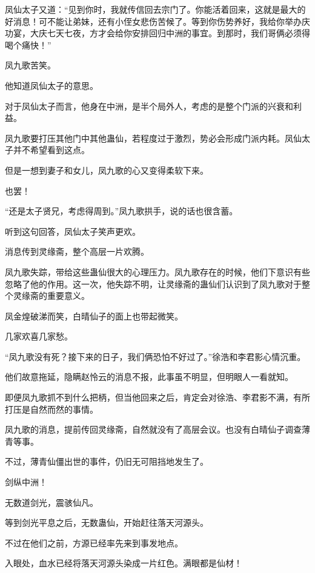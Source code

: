 \begin{this_body}
凤仙太子又道：“见到你时，我就传信回去宗门了。你能活着回来，这就是最大的好消息！可不能让弟妹，还有小侄女悲伤苦候了。等到你伤势养好，我给你举办庆功宴，大庆七天七夜，方才会给你安排回归中洲的事宜。到那时，我们哥俩必须得喝个痛快！”

凤九歌苦笑。

他知道凤仙太子的意思。

对于凤仙太子而言，他身在中洲，是半个局外人，考虑的是整个门派的兴衰和利益。

凤九歌要打压其他门中其他蛊仙，若程度过于激烈，势必会形成门派内耗。凤仙太子并不希望看到这点。

但是一想到妻子和女儿，凤九歌的心又变得柔软下来。

也罢！

“还是太子贤兄，考虑得周到。”凤九歌拱手，说的话也很含蓄。

听到这句回答，凤仙太子笑声更欢。

消息传到灵缘斋，整个高层一片欢腾。

凤九歌失踪，带给这些蛊仙很大的心理压力。凤九歌存在的时候，他们下意识有些忽略了他的作用。这一次，他失踪不明，让灵缘斋的蛊仙们认识到了凤九歌对于整个灵缘斋的重要意义。

凤金煌破涕而笑，白晴仙子的面上也带起微笑。

几家欢喜几家愁。

“凤九歌没有死？接下来的日子，我们俩恐怕不好过了。”徐浩和李君影心情沉重。

他们故意拖延，隐瞒赵怜云的消息不报，此事虽不明显，但明眼人一看就知。

即便凤九歌抓不到什么把柄，但当他回来之后，肯定会对徐浩、李君影不满，有所打压是自然而然的事情。

凤九歌的消息，提前传回灵缘斋，自然就没有了高层会议。也没有白晴仙子调查薄青等事。

不过，薄青仙僵出世的事件，仍旧无可阻挡地发生了。

剑纵中洲！

无数道剑光，震骇仙凡。

等到剑光平息之后，无数蛊仙，开始赶往落天河源头。

不过在他们之前，方源已经率先来到事发地点。

入眼处，血水已经将落天河源头染成一片红色。满眼都是仙材！

\end{this_body}


